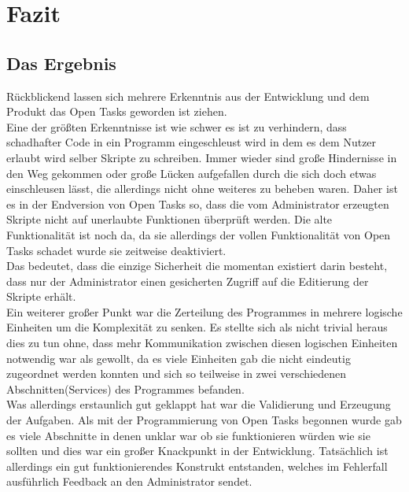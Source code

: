 \chapter{Fazit}




\section{Das Ergebnis}

Rückblickend lassen sich mehrere Erkenntnis aus der Entwicklung und dem Produkt das Open Tasks geworden ist ziehen. \\

Eine der größten Erkenntnisse ist wie schwer es ist zu verhindern, dass schadhafter Code in ein Programm eingeschleust wird in dem es dem Nutzer erlaubt wird selber Skripte zu schreiben. Immer wieder sind große Hindernisse in den Weg gekommen oder große Lücken aufgefallen durch die sich doch etwas einschleusen lässt, die allerdings nicht ohne weiteres zu beheben waren. Daher ist es in der Endversion von Open Tasks so, dass die vom Administrator erzeugten Skripte nicht auf unerlaubte Funktionen überprüft werden. Die alte Funktionalität ist noch da, da sie allerdings der vollen Funktionalität von Open Tasks schadet wurde sie zeitweise deaktiviert. \\
Das bedeutet, dass die einzige Sicherheit die momentan existiert darin besteht, dass nur der Administrator einen gesicherten Zugriff auf die Editierung der Skripte erhält. \\

Ein weiterer großer Punkt war die Zerteilung des Programmes in mehrere logische Einheiten um die Komplexität zu senken. Es stellte sich als nicht trivial heraus dies zu tun ohne, dass mehr Kommunikation zwischen diesen logischen Einheiten notwendig war als gewollt, da es viele Einheiten gab die nicht eindeutig zugeordnet werden konnten und sich so teilweise in zwei verschiedenen Abschnitten(Services) des Programmes befanden. \\

Was allerdings erstaunlich gut geklappt hat war die Validierung und Erzeugung der Aufgaben. Als mit der Programmierung von Open Tasks begonnen wurde gab es viele Abschnitte in denen unklar war ob sie funktionieren würden wie sie sollten und dies war ein großer Knackpunkt in der Entwicklung. Tatsächlich ist allerdings ein gut funktionierendes Konstrukt entstanden, welches im Fehlerfall ausführlich Feedback an den Administrator sendet. \\



